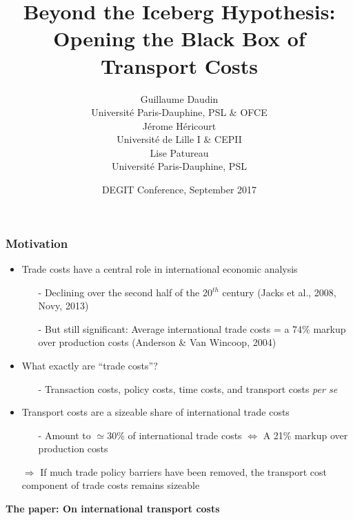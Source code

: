\documentclass[10 pt,Helvetica, french]{beamer}
\date[September 2017]{DEGIT Conference, September 2017}
\title[Trade Costs Black Box]{Beyond the Iceberg Hypothesis: \\Opening the Black Box of Transport Costs}
\author[Daudin et al.]{Guillaume Daudin\\
{\footnotesize Universit\'{e} Paris-Dauphine, PSL \& OFCE }\\ \smallskip
J\'{e}rome H\'{e}ricourt \\
{\footnotesize Universit\'{e} de Lille I \& CEPII }\\  \smallskip
Lise Patureau \\
{\footnotesize  Universit\'{e} Paris-Dauphine, PSL}}
\begin{document}
\begin{frame}[plain]
\titlepage
\end{frame}


\begin{frame}
\frametitle{Motivation}
\begin{itemize}
\item Trade costs have a central role in international economic analysis \vspace{0.1cm}
\begin{itemize}
\item[-] Declining over the second half of the 20$^{th}$ century (Jacks et al., 2008, Novy, 2013) \vspace{0.1cm}
\item[-] But still significant: Average international trade costs = a 74\% markup over production costs (Anderson \& Van Wincoop, 2004)
\end{itemize}
\item What exactly are ``trade costs''?  \vspace{0.1cm}
\begin{itemize}
\item[-] Transaction costs, policy costs, time costs, and transport costs \textit{per se}
\end{itemize}
\item Transport costs are a sizeable share of international trade costs \vspace{0.1cm}
\begin{itemize}
\item[-]  Amount to $\simeq 30\%$ of international trade costs  $\Leftrightarrow$ A 21\% markup over production costs  \vspace{0.1cm}
\end{itemize}
\item[$\Rightarrow$] If much trade policy barriers have been removed, the transport cost component of trade costs remains sizeable \vspace{0.1cm}
\end{itemize}
\textbf{The paper: On international transport costs}

\end{frame}
\end{document}
